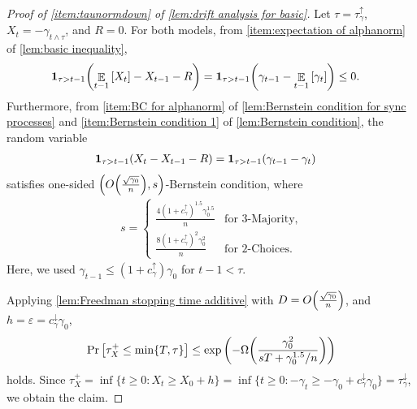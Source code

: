 \documentclass[letterpaper,11pt]{article}
\newcommand{\indicator}{\mathbf{1}}
\DeclareMathOperator*{\E}{\mathbb{E}}
\newcommand{\alphanorm}{\gamma}
\newcommand{\bounded}{D}
\newcommand{\variance}{s}
\newcommand{\taunormup}{\tau^{\uparrow}_\alphanorm}
\newcommand{\taunormdown}{\tau^{\downarrow}_\alphanorm}
\newcommand{\cnormup}{c^{\uparrow}_\alphanorm}
\newcommand{\cnormdown}{c^{\downarrow}_\alphanorm}
\newcommand{\tauidown}{\tau^{\downarrow}_i}
\newcommand{\drift}{R}
\newcommand{\tauxplus}{\tau_X^+}
\begin{document}
\begin{proof}[Proof of \cref{item:taunormdown} of \cref{lem:drift analysis for basic}]
  Let $\tau = \taunormup$, $X_t=-\alphanorm_{t\wedge \tau}$, and $\drift = 0$.
  For both models, from \cref{item:expectation of alphanorm} of \cref{lem:basic inequality}, 
    \begin{align*}
        \indicator_{\tau>t-1}\qty(\E_{t-1}\qty[ X_t ]-X_{t-1}-R)
        &=\indicator_{\tau>t-1}\qty(\alphanorm_{t-1}-\E_{t-1}\qty[\alphanorm_{t}])
        \leq 0.
    \end{align*}
    Furthermore, from \cref{item:BC for alphanorm} of \cref{lem:Bernstein condition for sync processes}
    and \cref{item:Bernstein condition 1} of \cref{lem:Bernstein condition}, 
    the random variable
    \begin{align*}
        \indicator_{\tau>t-1}\qty( X_t - X_{t-1}-R)
        &=\indicator_{\tau>t-1}\qty(\alphanorm_{t-1}-\alphanorm_{t})
    \end{align*}
    satisfies one-sided $\qty(O\qty(\frac{\sqrt{\alphanorm_0}}{n}),\variance)$-Bernstein condition, where
    \begin{align*}
       \variance = \begin{cases}
          \frac{4(1+\cnormup)^{1.5}\alphanorm_{0}^{1.5}}{n}	& \text{for 3-Majority},\\[10pt]
          \frac{8(1+\cnormup)^{2}\alphanorm_{0}^2}{n} & \text{for 2-Choices}.
       \end{cases}
    \end{align*} 
    Here, we used $ \alphanorm_{t-1} \le (1+\cnormup)\alphanorm_0 $ for $ t-1 < \tau $.


    Applying \cref{lem:Freedman stopping time additive} with $\bounded = O\qty(\frac{\sqrt{\alphanorm_0}}{n})$, and $h=\varepsilon= \cnormdown \alphanorm_0$, 
    \begin{align*}
        \Pr\qty[\tauxplus\leq \min\{T,\tau\}]
        \leq \exp\qty(-\Omega\qty(\frac{\alphanorm_0^2}{\variance T+\alphanorm_0^{1.5}/n}))
    \end{align*}
    holds. Since $\tauxplus=\inf\{t\geq 0: X_t\geq X_0+h\}=\inf\{t\geq 0: -\alphanorm_t\geq -\alphanorm_0+\cnormdown \alphanorm_0\}=\taunormdown$, we obtain the claim.
\end{proof}
\end{document}
